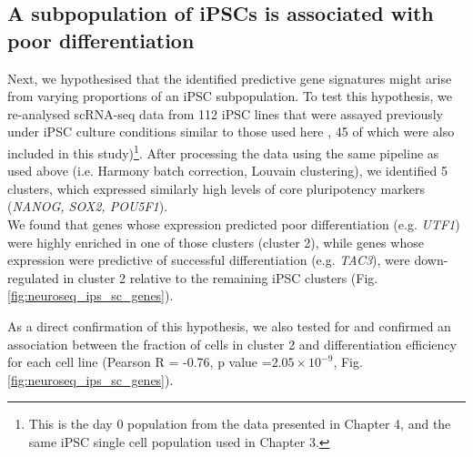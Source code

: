 \newpage

\subsection{A subpopulation of iPSCs is associated with poor differentiation}

Next, 
we hypothesised that the identified predictive gene signatures might arise from varying proportions of an iPSC subpopulation. %
To test this hypothesis, we re-analysed scRNA-seq data from 112 iPSC lines that were assayed previously under iPSC culture conditions similar to those used here
\cite{cuomo2020single}, 45 of which were also included in this study)\footnote{This is the day 0 population from the data presented in Chapter 4, and the same iPSC single cell population used in Chapter 3.}. 
After processing the data using the same pipeline as used above (i.e. Harmony batch correction, Louvain clustering),
we identified 5 clusters, 
which expressed similarly high levels of core pluripotency markers (\textit{NANOG, SOX2, POU5F1}). \\

We found that genes whose expression predicted poor differentiation (e.g. \textit{UTF1}) were highly enriched in one of those clusters (cluster 2), while genes whose expression were predictive of successful differentiation (e.g. \textit{TAC3}), were down-regulated in cluster 2 relative to the remaining iPSC clusters (Fig. \ref{fig:neuroseq_ips_sc_genes}). 

As a direct confirmation of this hypothesis, we also tested for and confirmed an association between the fraction of cells in cluster 2 and differentiation efficiency for each cell line (Pearson R = -0.76, p value =$2.05 \times 10^{-9}$, Fig. \ref{fig:neuroseq_ips_sc_genes}). 

